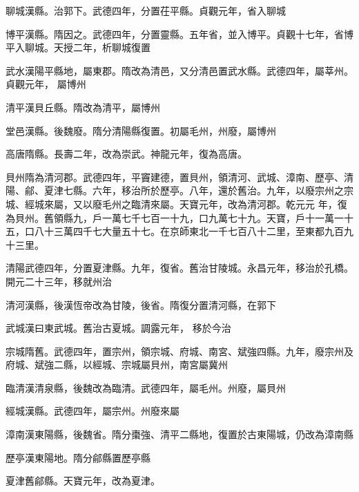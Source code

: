 \begin{pinyinscope}
 聊城漢縣。治郭下。武德四年，分置茌平縣。貞觀元年，省入聊城



 博平漢縣。隋因之。武德四年，分置靈縣。五年省，並入博平。貞觀十七年，省博平入聊城。天授二年，析聊城復置



 武水漢陽平縣地，屬東郡。隋改為清邑，又分清邑置武水縣。武德四年，屬莘州。貞觀元年，
 屬博州



 清平漢貝丘縣。隋改為清平，屬博州



 堂邑漢縣。後魏廢。隋分清陽縣復置。初屬毛州，州廢，屬博州



 高唐隋縣。長壽二年，改為崇武。神龍元年，復為高唐。



 貝州隋為清河郡。武德四年，平竇建德，置貝州，領清河、武城、漳南、歷亭、清陽、鄃、夏津七縣。六年，移治所於歷亭。八年，還於舊治。九年，以廢宗州之宗城、經城來屬，又以廢毛州之臨清來屬。天寶元年，改為清河郡。乾元元
 年，復為貝州。舊領縣九，戶一萬七千七百一十九，口九萬七十九。天寶，戶十一萬一十五，口八十三萬四千七大量五十七。在京師東北一千七百八十二里，至東都九百九十三里。



 清陽武德四年，分置夏津縣。九年，復省。舊治甘陵城。永昌元年，移治於孔橋。開元二十三年，移就州治



 清河漢縣，後漢恆帝改為甘陵，後省。隋復分置清河縣，在郭下



 武城漢曰東武城。舊治古夏城。調露元年，
 移於今治



 宗城隋舊。武德四年，置宗州，領宗城、府城、南宮、斌強四縣。九年，廢宗州及府城、斌強二縣，以經城、宗城屬貝州，南宮屬冀州



 臨清漢清泉縣，後魏改為臨清。武德四年，屬毛州。州廢，屬貝州



 經城漢縣。武德四年，屬宗州。州廢來屬



 漳南漢東陽縣，後魏省。隋分棗強、清平二縣地，復置於古東陽城，仍改為漳南縣



 歷亭漢東陽地。隋分鄃縣置歷亭縣



 夏津舊鄃縣。天寶元年，改為夏津。




\end{pinyinscope}
